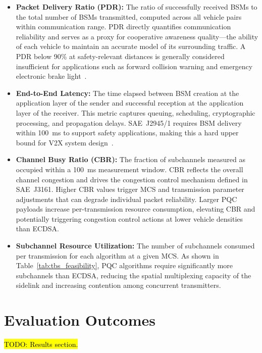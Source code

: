 \documentclass[letterpaper,journal]{IEEEtran}
\begin{document}
\begin{itemize}
    \item \textbf{Packet Delivery Ratio (PDR):} The ratio of successfully received BSMs to the total number of BSMs transmitted, computed across all vehicle pairs within communication range. PDR directly quantifies communication reliability and serves as a proxy for cooperative awareness quality---the ability of each vehicle to maintain an accurate model of its surrounding traffic. A PDR below 90\% at safety-relevant distances is generally considered insufficient for applications such as forward collision warning and emergency electronic brake light~\cite{twardokus2025chasm}.
    \item \textbf{End-to-End Latency:} The time elapsed between BSM creation at the application layer of the sender and successful reception at the application layer of the receiver. This metric captures queuing, scheduling, cryptographic processing, and propagation delays. SAE~J2945/1 requires BSM delivery within 100~ms to support safety applications, making this a hard upper bound for V2X system design~\cite{sae_j29451}.
    \item \textbf{Channel Busy Ratio (CBR):} The fraction of subchannels measured as occupied within a 100~ms measurement window. CBR reflects the overall channel congestion and drives the congestion control mechanism defined in SAE~J3161. Higher CBR values trigger MCS and transmission parameter adjustments that can degrade individual packet reliability. Larger PQC payloads increase per-transmission resource consumption, elevating CBR and potentially triggering congestion control actions at lower vehicle densities than ECDSA.
    \item \textbf{Subchannel Resource Utilization:} The number of subchannels consumed per transmission for each algorithm at a given MCS. As shown in Table~\ref{tab:tbs_feasibility}, PQC algorithms require significantly more subchannels than ECDSA, reducing the spatial multiplexing capacity of the sidelink and increasing contention among concurrent transmitters.
\end{itemize}

\section{Evaluation Outcomes}
\label{sec:results}

\hl{TODO: Results section.}
\end{document}
